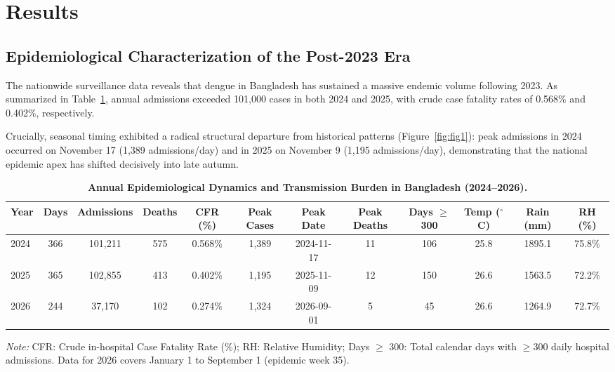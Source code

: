 \documentclass[11pt,a4paper]{article}
\begin{document}
\section{Results}

\subsection{Epidemiological Characterization of the Post-2023 Era}
The nationwide surveillance data reveals that dengue in Bangladesh has sustained a massive endemic volume following 2023. As summarized in Table~\ref{tab:table1}, annual admissions exceeded 101,000 cases in both 2024 and 2025, with crude case fatality rates of 0.568\% and 0.402\%, respectively.

Crucially, seasonal timing exhibited a radical structural departure from historical patterns (Figure~\ref{fig:fig1}): peak admissions in 2024 occurred on November 17 (1,389 admissions/day) and in 2025 on November 9 (1,195 admissions/day), demonstrating that the national epidemic apex has shifted decisively into late autumn.

\begin{table}[t]
\centering
\small
\caption{\textbf{Annual Epidemiological Dynamics and Transmission Burden in Bangladesh (2024--2026).}}
\label{tab:table1}
\begin{tabular*}{\textwidth}{@{\extracolsep{\fill}}lccccccccccc@{}}
\toprule
\textbf{Year} & \textbf{Days} & \textbf{Admissions} & \textbf{Deaths} & \textbf{CFR (\%)} & \textbf{Peak Cases} & \textbf{Peak Date} & \textbf{Peak Deaths} & \textbf{Days $\ge$300} & \textbf{Temp ($^\circ$C)} & \textbf{Rain (mm)} & \textbf{RH (\%)} \\
\midrule
2024 & 366 & 101,211 & 575 & 0.568\% & 1,389 & 2024-11-17 & 11 & 106 & 25.8 & 1895.1 & 75.8\% \\
2025 & 365 & 102,855 & 413 & 0.402\% & 1,195 & 2025-11-09 & 12 & 150 & 26.6 & 1563.5 & 72.2\% \\
2026 & 244 & 37,170 & 102 & 0.274\% & 1,324 & 2026-09-01 & 5 & 45 & 26.6 & 1264.9 & 72.7\% \\
\bottomrule
\end{tabular*}
\begin{flushleft}
\footnotesize{\textit{Note:} CFR: Crude in-hospital Case Fatality Rate (\%); RH: Relative Humidity; Days $\ge$ 300: Total calendar days with $\ge 300$ daily hospital admissions. Data for 2026 covers January 1 to September 1 (epidemic week 35).}
\end{flushleft}
\end{table}
\end{document}
